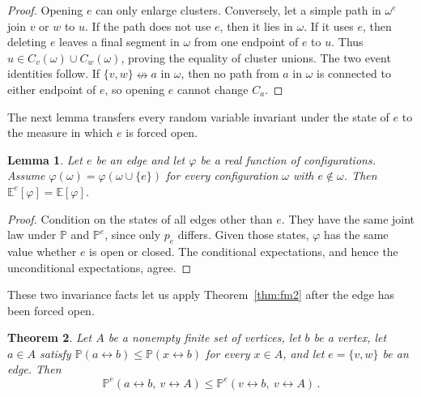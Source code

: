 \documentclass[11pt]{article}
\newtheorem{theorem}{Theorem}[section]
\newtheorem{lemma}[theorem]{Lemma}
\theoremstyle{definition}
\theoremstyle{remark}
\newcommand{\PP}{\mathbb P}
\newcommand{\EE}{\mathbb E}
\newcommand{\con}{\leftrightarrow}
\newcommand{\ncon}{\nleftrightarrow}
\begin{document}
\begin{proof}
Opening $e$ can only enlarge clusters. Conversely, let a simple path in $\omega^e$ join
$v$ or $w$ to $u$. If the path does not use $e$, then it lies in $\omega$. If it uses $e$,
then deleting $e$ leaves a final segment in $\omega$ from one endpoint of $e$ to $u$. Thus
$u\in C_v(\omega)\cup C_w(\omega)$, proving the equality of cluster unions. The two event
identities follow. If $\{v,w\}\ncon a$ in $\omega$, then no path from $a$ in $\omega$ is
connected to either endpoint of $e$, so opening $e$ cannot change $C_a$.
\end{proof}

The next lemma transfers every random variable invariant under the state of $e$ to the
measure in which $e$ is forced open.

\begin{lemma}\label{lem:force}
Let $e$ be an edge and let $\varphi$ be a real function of configurations. Assume
$\varphi(\omega)=\varphi(\omega\cup\{e\})$ for every configuration $\omega$ with
$e\notin\omega$. Then $\EE^e[\varphi]=\EE[\varphi]$.
\end{lemma}

\begin{proof}
Condition on the states of all edges other than $e$. They have the same joint law under
$\PP$ and $\PP^e$, since only $p_e$ differs. Given those states, $\varphi$ has the same
value whether $e$ is open or closed. The conditional expectations, and hence the
unconditional expectations, agree.
\end{proof}

These two invariance facts let us apply Theorem~\ref{thm:fm2} after the edge has been
forced open.

\begin{theorem}\label{thm:c6strong}
Let $A$ be a nonempty finite set of vertices, let $b$ be a vertex, let $a\in A$ satisfy
$\PP(a\con b)\leq\PP(x\con b)$ for every $x\in A$, and let $e=\{v,w\}$ be an edge. Then
\begin{equation}\label{eq:c6strong}
 \PP^e(a\con b,\ v\con A)\leq \PP^e(v\con b,\ v\con A)\,.
\end{equation}
\end{theorem}
\end{document}
